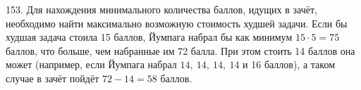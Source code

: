 153. Для нахождения минимального количества баллов, идущих в зачёт, необходимо найти максимально возможную стоимость худшей задачи. Если бы худшая задача стоила 15 баллов, Йумпага набрал бы как минимум $15\cdot5=75$ баллов, что больше, чем набранные им 72 балла. При этом стоить 14 баллов она может (например, если Йумпага набрал $14,\ 14,\ 14,\ 14$ и 16 баллов), а таком случае в зачёт пойдёт $72-14=58$ баллов.\\
